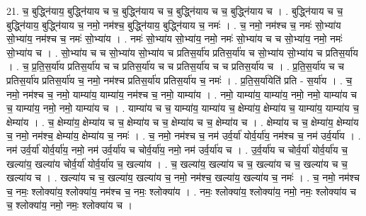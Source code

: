 \documentclass[17pt]{extarticle}
\begin{document}
21. च॒ बुद्ध्नि॑याय॒ बुद्ध्नि॑याय च च॒ बुद्ध्नि॑याय च च॒ बुद्ध्नि॑याय च च॒ बुद्ध्नि॑याय च । . बुद्ध्नि॑याय च च॒ बुद्ध्नि॑याय॒ बुद्ध्नि॑याय च॒ नमो॒ नम॑श्च॒ बुद्ध्नि॑याय॒ बुद्ध्नि॑याय च॒ नमः॑ । . च॒ नमो॒ नम॑श्च च॒ नमः॑ सो॒भ्या॑य सो॒भ्या॑य॒ नम॑श्च च॒ नमः॑ सो॒भ्या॑य । . नमः॑ सो॒भ्या॑य सो॒भ्या॑य॒ नमो॒ नमः॑ सो॒भ्या॑य च च सो॒भ्या॑य॒ नमो॒ नमः॑ सो॒भ्या॑य च । . सो॒भ्या॑य च च सो॒भ्या॑य सो॒भ्या॑य च प्रतिस॒र्या॑य प्रतिस॒र्या॑य च सो॒भ्या॑य सो॒भ्या॑य च प्रतिस॒र्या॑य । . च॒ प्र॒ति॒स॒र्या॑य प्रतिस॒र्या॑य च च प्रतिस॒र्या॑य च च प्रतिस॒र्या॑य च च प्रतिस॒र्या॑य च । . प्र॒ति॒स॒र्या॑य च च प्रतिस॒र्या॑य प्रतिस॒र्या॑य च॒ नमो॒ नम॑श्च प्रतिस॒र्या॑य प्रतिस॒र्या॑य च॒ नमः॑ । . प्र॒ति॒स॒र्या॑येति॑ प्रति - स॒र्या॑य । . च॒ नमो॒ नम॑श्च च॒ नमो॒ याम्या॑य॒ याम्या॑य॒ नम॑श्च च॒ नमो॒ याम्या॑य । . नमो॒ याम्या॑य॒ याम्या॑य॒ नमो॒ नमो॒ याम्या॑य च च॒ याम्या॑य॒ नमो॒ नमो॒ याम्या॑य च । . याम्या॑य च च॒ याम्या॑य॒ याम्या॑य च॒ क्षेम्या॑य॒ क्षेम्या॑य च॒ याम्या॑य॒ याम्या॑य च॒ क्षेम्या॑य । . च॒ क्षेम्या॑य॒ क्षेम्या॑य च च॒ क्षेम्या॑य च च॒ क्षेम्या॑य च च॒ क्षेम्या॑य च । . क्षेम्या॑य च च॒ क्षेम्या॑य॒ क्षेम्या॑य च॒ नमो॒ नम॑श्च॒ क्षेम्या॑य॒ क्षेम्या॑य च॒ नमः॑ । . च॒ नमो॒ नम॑श्च च॒ नम॑ उर्व॒र्या॑ योर्व॒र्या॑य॒ नम॑श्च च॒ नम॑ उर्व॒र्या॑य । . नम॑ उर्व॒र्या॑ योर्व॒र्या॑य॒ नमो॒ नम॑ उर्व॒र्या॑य च चोर्व॒र्या॑य॒ नमो॒ नम॑ उर्व॒र्या॑य च । . उ॒र्व॒र्या॑य च चोर्व॒र्या॑ योर्व॒र्या॑य च॒ खल्या॑य॒ खल्या॑य चोर्व॒र्या॑ योर्व॒र्या॑य च॒ खल्या॑य । . च॒ खल्या॑य॒ खल्या॑य च च॒ खल्या॑य च च॒ खल्या॑य च च॒ खल्या॑य च । . खल्या॑य च च॒ खल्या॑य॒ खल्या॑य च॒ नमो॒ नम॑श्च॒ खल्या॑य॒ खल्या॑य च॒ नमः॑ । . च॒ नमो॒ नम॑श्च च॒ नमः॒ श्लोक्या॑य॒ श्लोक्या॑य॒ नम॑श्च च॒ नमः॒ श्लोक्या॑य । . नमः॒ श्लोक्या॑य॒ श्लोक्या॑य॒ नमो॒ नमः॒ श्लोक्या॑य च च॒ श्लोक्या॑य॒ नमो॒ नमः॒ श्लोक्या॑य च । \newline
\end{document}

